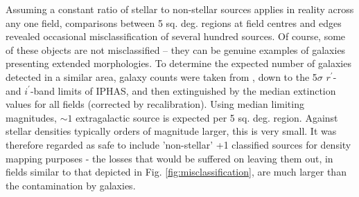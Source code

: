 \documentclass[a4paper,useAMS,usenatbib]{mn2e}
\begin{document}
Assuming a constant ratio of stellar to non-stellar sources applies in reality across any one field,
comparisons between 5 sq. deg. regions at field centres and edges revealed
occasional misclassification of  several hundred sources. Of course, some of these objects are not misclassified -- they can
be genuine examples of galaxies presenting extended morphologies.  To determine the
expected number of galaxies detected in a similar area, galaxy counts were taken from \citet{Yasuda2001}, down to the 
5$\sigma$ $r^{\prime}$- and $i^{\prime}$-band limits of IPHAS, and then extinguished by the median \citet{Schlegel1998} 
extinction values for all fields (corrected by \citet{Schlafly2011} recalibration). Using median limiting magnitudes, 
$\sim 1$ extragalactic source is expected per 5 sq. deg. region. Against stellar densities typically orders of magnitude 
larger, this is very small.  It was therefore regarded as safe to include 'non-stellar' +1 classified sources for 
density mapping purposes - the losses that would be  suffered on leaving them out, in fields similar to that depicted in 
Fig. \ref{fig:misclassification}, are much larger than  the contamination by galaxies.


\end{document}
